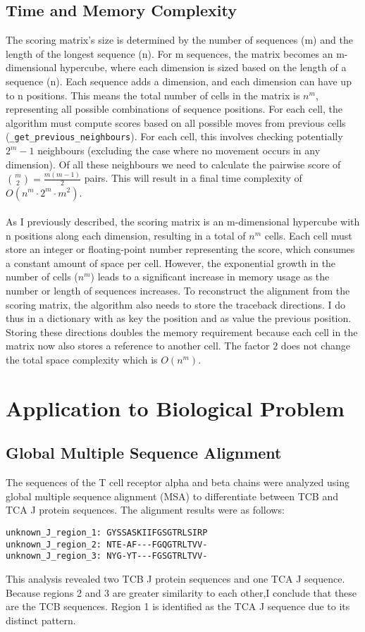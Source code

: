\documentclass{article}
\begin{document}
\subsection{Time and Memory Complexity}

The scoring matrix's size is determined by the number of sequences (m) and the length of the longest sequence (n). For m sequences, the matrix becomes an m-dimensional hypercube, where each dimension is sized based on the length of a sequence (n). Each sequence adds a dimension, and each dimension can have up to n positions. This means the total number of cells in the matrix is $n^m$, representing all possible combinations of sequence positions. For each cell, the algorithm must compute scores based on all possible moves from previous cells (\texttt{\_get\_previous\_neighbours}). For each cell, this involves checking potentially $2^m-1$ neighbours (excluding the case where no movement occurs in any dimension). Of all these neighbours we need to calculate the pairwise score of $ \binom{m}{2} = \frac{m(m-1)}{2}$ pairs. This will result in a final time complexity of $O(n^m \cdot 2^m \cdot m^2)$.\\
\\
As I previously described, the scoring matrix is an m-dimensional hypercube with n positions along each dimension, resulting in a total of $n^m$ cells. Each cell must store an integer or floating-point number representing the score, which consumes a constant amount of space per cell. However, the exponential growth in the number of cells ($n^m$) leads to a significant increase in memory usage as the number or length of sequences increases. To reconstruct the alignment from the scoring matrix, the algorithm also needs to store the traceback directions. I do thus in a dictionary with as key the position and as value the previous position. Storing these directions doubles the memory requirement because each cell in the matrix now also stores a reference to another cell. The factor $2$ does not change the total space complexity which is $O(n^m)$.
\section{Application to Biological Problem}
\subsection{Global Multiple Sequence Alignment}
The sequences of the T cell receptor alpha and beta chains were analyzed using global multiple sequence alignment (MSA) to differentiate between TCB and TCA J protein sequences. The alignment results were as follows:
\begin{verbatim}
unknown_J_region_1: GYSSASKIIFGSGTRLSIRP
unknown_J_region_2: NTE-AF---FGQGTRLTVV-
unknown_J_region_3: NYG-YT---FGSGTRLTVV-
\end{verbatim}
This analysis revealed two TCB J protein sequences and one TCA J sequence. Because regions 2 and 3 are greater similarity to each other,I conclude that these are the TCB sequences. Region 1 is identified as the TCA J sequence due to its distinct pattern.
\end{document}
